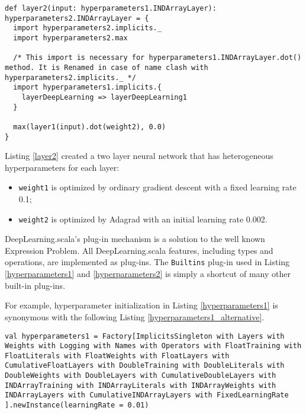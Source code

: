 \begin{lstlisting}[caption={A two layer neural network built from heterogeneous hyperparameters}, label={layer2}]
def layer2(input: hyperparameters1.INDArrayLayer): hyperparameters2.INDArrayLayer = {
  import hyperparameters2.implicits._
  import hyperparameters2.max
  
  /* This import is necessary for hyperparameters1.INDArrayLayer.dot() method. It is Renamed in case of name clash with hyperparameters2.implicits._ */
  import hyperparameters1.implicits.{
  	layerDeepLearning => layerDeepLearning1
  }
  
  max(layer1(input).dot(weight2), 0.0)
}
\end{lstlisting}

Listing \ref{layer2} created a two layer neural network that has heterogeneous hyperparameters for each layer:

\begin{itemize}
  \item \lstinline{weight1} is optimized by ordinary gradient descent with a fixed learning rate 0.1;
  \item \lstinline{weight2} is optimized by Adagrad with an initial learning rate 0.002.
\end{itemize}

DeepLearning.scala's \gls{plug-in} mechanism is a solution to the well known Expression Problem\cite{wadler1998expression}. All DeepLearning.scala features, including types and operations, are implemented as \glspl{plug-in}. The \lstinline{Builtins} \gls{plug-in} used in Listing \ref{hyperparameters1} and \ref{hyperparameters2} is simply a shortcut of many other built-in \glspl{plug-in}.

For example, hyperparameter initialization in Listing \ref{hyperparameters1} is synonymous with the following Listing \ref{hyperparameters1_alternative}.

\begin{lstlisting}[caption={Configuring hyperparameters with a fixed learning rate, alternatively}, label={hyperparameters1_alternative}]
val hyperparameters1 = Factory[ImplicitsSingleton with Layers with Weights with Logging with Names with Operators with FloatTraining with FloatLiterals with FloatWeights with FloatLayers with CumulativeFloatLayers with DoubleTraining with DoubleLiterals with DoubleWeights with DoubleLayers with CumulativeDoubleLayers with INDArrayTraining with INDArrayLiterals with INDArrayWeights with INDArrayLayers with CumulativeINDArrayLayers with FixedLearningRate
].newInstance(learningRate = 0.01)
\end{lstlisting}

